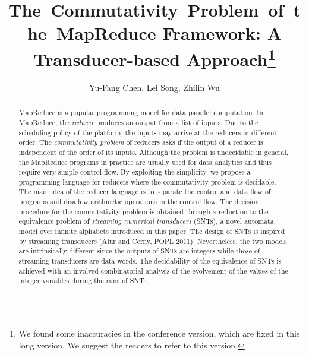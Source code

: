 \documentclass[runningheads,a4paper]{llncs}
\title{The~Commutativity~Problem~of~the~MapReduce Framework: A Transducer-based Approach\thanks{We found some inaccuracies in the conference version, which are fixed in this long version. We suggest the readers to refer to this version.}}
\institute{Institute of Information Science, Academia Sinica \and State Key Laboratory of Computer Science,\\ Institute of Software, Chinese Academy of Sciences }
\author{Yu-Fang Chen\inst{1}, Lei Song\inst{2}, Zhilin Wu\inst{2}}
\begin{document}
\maketitle

\vspace{-4mm}

\begin{abstract}

MapReduce is a popular programming model for data parallel computation. 
In MapReduce, the \emph{reducer} produces an output from a list of inputs. Due to the scheduling policy of the platform, the inputs may arrive at the reducers in different order. The \emph{commutativity problem} of reducers asks if the output of a reducer is independent of the order of its inputs. Although the problem is undecidable in general,
the MapReduce programs in practice are usually used for data analytics and thus require very simple control flow. 
By exploiting the simplicity, we propose a programming language for reducers where the commutativity problem is decidable. The main idea of the reducer language is to separate the control and data flow of programs and disallow arithmetic operations in the control flow.
The decision procedure for the commutativity problem is obtained through a reduction to the equivalence problem of \emph{streaming numerical transducers} (SNTs), a novel automata model over infinite alphabets introduced in this paper. The design of SNTs is inspired by streaming transducers (Alur and Cerny, POPL 2011). Nevertheless, the two models are intrinsically different since the outputs of SNTs are integers while those of streaming transducers are data words. 
The decidability of the equivalence of SNTs is achieved with an involved combinatorial analysis of the evolvement of the values of the integer variables during the runs of SNTs.
\end{abstract}

\vspace{-8mm}


\vspace{-2mm}


\vspace{-2mm}


\vspace{-0.3cm}


\vspace{-0.3cm}



\end{document}
